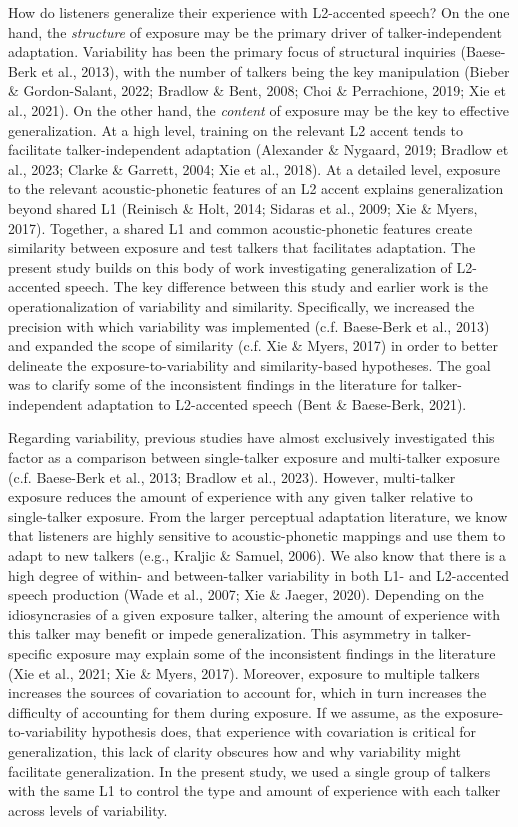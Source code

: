 \documentclass[
  12pt,
  twoside]{article}
\begin{document}
How do listeners generalize their experience with L2-accented speech?
On the one hand, the \emph{structure} of exposure may be the primary driver of talker-independent adaptation.
Variability has been the primary focus of structural inquiries (Baese-Berk et al., 2013), with the number of talkers being the key manipulation (Bieber \& Gordon-Salant, 2022; Bradlow \& Bent, 2008; Choi \& Perrachione, 2019; Xie et al., 2021).
On the other hand, the \emph{content} of exposure may be the key to effective generalization.
At a high level, training on the relevant L2 accent tends to facilitate talker-independent adaptation (Alexander \& Nygaard, 2019; Bradlow et al., 2023; Clarke \& Garrett, 2004; Xie et al., 2018).
At a detailed level, exposure to the relevant acoustic-phonetic features of an L2 accent explains generalization beyond shared L1 (Reinisch \& Holt, 2014; Sidaras et al., 2009; Xie \& Myers, 2017).
Together, a shared L1 and common acoustic-phonetic features create similarity between exposure and test talkers that facilitates adaptation.
The present study builds on this body of work investigating generalization of L2-accented speech.
The key difference between this study and earlier work is the operationalization of variability and similarity.
Specifically, we increased the precision with which variability was implemented (c.f. Baese-Berk et al., 2013) and expanded the scope of similarity (c.f. Xie \& Myers, 2017) in order to better delineate the exposure-to-variability and similarity-based hypotheses.
The goal was to clarify some of the inconsistent findings in the literature for talker-independent adaptation to L2-accented speech (Bent \& Baese-Berk, 2021).

Regarding variability, previous studies have almost exclusively investigated this factor as a comparison between single-talker exposure and multi-talker exposure (c.f. Baese-Berk et al., 2013; Bradlow et al., 2023).
However, multi-talker exposure reduces the amount of experience with any given talker relative to single-talker exposure.
From the larger perceptual adaptation literature, we know that listeners are highly sensitive to acoustic-phonetic mappings and use them to adapt to new talkers (e.g., Kraljic \& Samuel, 2006).
We also know that there is a high degree of within- and between-talker variability in both L1- and L2-accented speech production (Wade et al., 2007; Xie \& Jaeger, 2020).
Depending on the idiosyncrasies of a given exposure talker, altering the amount of experience with this talker may benefit or impede generalization.
This asymmetry in talker-specific exposure may explain some of the inconsistent findings in the literature (Xie et al., 2021; Xie \& Myers, 2017).
Moreover, exposure to multiple talkers increases the sources of covariation to account for, which in turn increases the difficulty of accounting for them during exposure.
If we assume, as the exposure-to-variability hypothesis does, that experience with covariation is critical for generalization, this lack of clarity obscures how and why variability might facilitate generalization.
In the present study, we used a single group of talkers with the same L1 to control the type and amount of experience with each talker across levels of variability.
\end{document}
